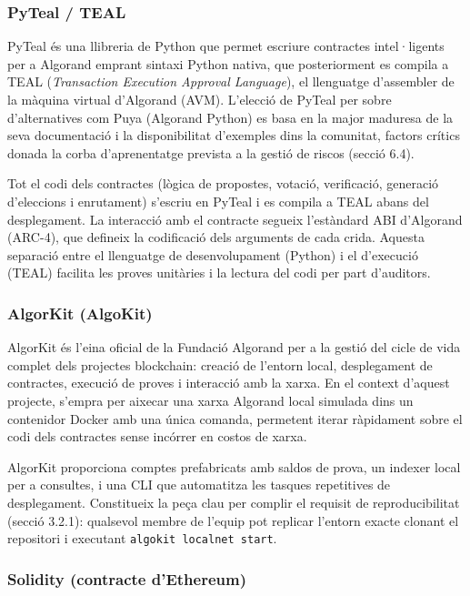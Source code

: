 \subsubsection{PyTeal / TEAL}
 
PyTeal és una llibreria de Python que permet escriure contractes intel·ligents per a Algorand emprant sintaxi Python nativa, que posteriorment es compila a TEAL (\textit{Transaction Execution Approval Language}), el llenguatge d'assembler de la màquina virtual d'Algorand (AVM). L'elecció de PyTeal per sobre d'alternatives com Puya (Algorand Python) es basa en la major maduresa de la seva documentació i la disponibilitat d'exemples dins la comunitat, factors crítics donada la corba d'aprenentatge prevista a la gestió de riscos (secció 6.4).
 
Tot el codi dels contractes (lògica de propostes, votació, verificació, generació d'eleccions i enrutament) s'escriu en PyTeal i es compila a TEAL abans del desplegament. La interacció amb el contracte segueix l'estàndard ABI d'Algorand (ARC-4), que defineix la codificació dels arguments de cada crida. Aquesta separació entre el llenguatge de desenvolupament (Python) i el d'execució (TEAL) facilita les proves unitàries i la lectura del codi per part d'auditors.
 
\subsubsection{AlgorKit (AlgoKit)}
 
AlgorKit és l'eina oficial de la Fundació Algorand per a la gestió del cicle de vida complet dels projectes blockchain: creació de l'entorn local, desplegament de contractes, execució de proves i interacció amb la xarxa. En el context d'aquest projecte, s'empra per aixecar una xarxa Algorand local simulada dins un contenidor Docker amb una única comanda, permetent iterar ràpidament sobre el codi dels contractes sense incórrer en costos de xarxa.
 
AlgorKit proporciona comptes prefabricats amb saldos de prova, un indexer local per a consultes, i una CLI que automatitza les tasques repetitives de desplegament. Constitueix la peça clau per complir el requisit de reproducibilitat (secció 3.2.1): qualsevol membre de l'equip pot replicar l'entorn exacte clonant el repositori i executant \texttt{algokit localnet start}.

\subsubsection{Solidity (contracte d'Ethereum)}

